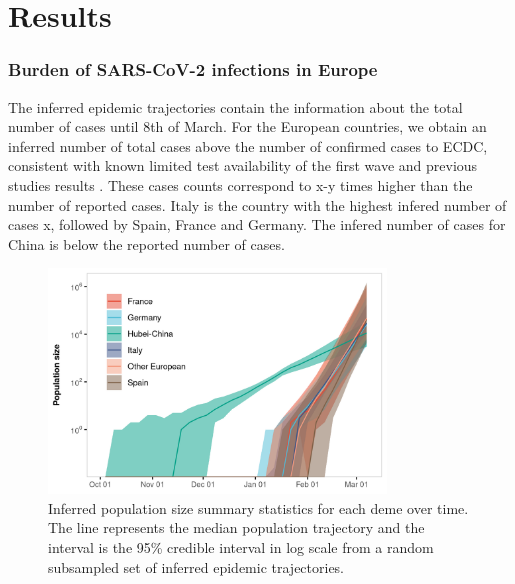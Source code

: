 \documentclass[12pt]{article}
\begin{document}
\section*{Results}


\subsubsection*{Burden of SARS-CoV-2 infections in Europe}

The inferred epidemic trajectories contain the information about the total number of cases until 8th of March. For the European countries, we obtain an inferred number of total cases above the number of confirmed cases to ECDC, consistent with known limited test availability of the first wave and  previous studies results \cite{Li2020} \cite{Wu2020}. These cases counts correspond to  x-y times higher than the number of reported cases. Italy is the country with the highest infered number of cases x, followed by Spain, France and Germany. The infered number of cases for China is below the reported number of cases. \\


\begin{figure}[ht]
    \centering
    \includegraphics[width=0.8\textwidth]{201030_europe3_figtraj01.png}
    \caption{Inferred population size summary statistics for each deme over time. The line represents the median population trajectory and the interval is the 95\%  credible interval in log scale from a random subsampled set of inferred epidemic trajectories.}
    \label{fig:gribbon}
\end{figure}
\end{document}
